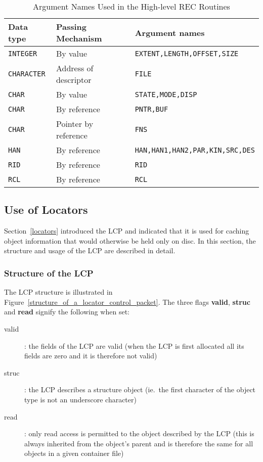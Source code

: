 \begin {table}[htbp]
\begin {center}
\begin {tabular}{||l|l|l||}
\hline
Data type	& Passing Mechanism	& Argument names \\
\hline
{\tt INTEGER}	& By value		& {\tt EXTENT,LENGTH,OFFSET,SIZE} \\
{\tt CHARACTER}	& Address of descriptor	& {\tt FILE} \\
{\tt CHAR}	& By value		& {\tt STATE,MODE,DISP} \\
{\tt CHAR}	& By reference		& {\tt PNTR,BUF} \\
{\tt CHAR}	& Pointer by reference	& {\tt FNS} \\
\hline
{\tt HAN}	& By reference		& {\tt HAN,HAN1,HAN2,PAR,KIN,SRC,DES} \\
{\tt RID}	& By reference		& {\tt RID} \\
{\tt RCL}	& By reference		& {\tt RCL} \\
\hline
\end {tabular}
\caption {Argument Names Used in the High-level REC Routines}
\label {argument_names_used_in_the_high_level_rec_routines}
\end {center}
\end {table}

\subsection {Use of Locators}                   
\label {use_of_locators}

Section~\ref{locators} introduced the LCP and indicated that it is used
for caching object information that would otherwise be held only on disc.
In this section, the structure and usage of the LCP are described in detail.

\subsubsection {Structure of the LCP}

The LCP structure is illustrated in
Figure~\ref{structure_of_a_locator_control_packet}. The three flags {\bf valid},
{\bf struc} and {\bf read} signify the following when set:

\begin {description}
\item [valid]: the fields of the LCP are valid (when the LCP is first allocated
all its fields are zero and it is therefore not valid)
\item [struc]: the LCP describes a structure object (ie.\ the first character
of the object type is not an underscore character)
\item [read]: only read access is permitted to the object described by the
LCP (this is always inherited from the object's parent and is therefore
the same for all objects in a given container file)
\end {description}

